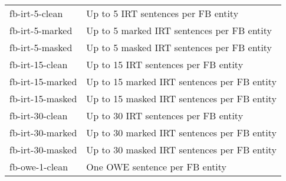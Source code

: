 \begin{tabular}{| l | l |}
    \hline

    fb-irt-5-clean    & Up to 5 IRT sentences per FB entity            \\
    fb-irt-5-marked   & Up to 5 marked IRT sentences per FB entity     \\
    fb-irt-5-masked   & Up to 5 masked IRT sentences per FB entity     \\

    \hline

    fb-irt-15-clean   & Up to 15 IRT sentences per FB entity           \\
    fb-irt-15-marked  & Up to 15 marked IRT sentences per FB entity    \\
    fb-irt-15-masked  & Up to 15 masked IRT sentences per FB entity    \\

    \hline

    fb-irt-30-clean   & Up to 30 IRT sentences per FB entity           \\
    fb-irt-30-marked  & Up to 30 marked IRT sentences per FB entity    \\
    fb-irt-30-masked  & Up to 30 masked IRT sentences per FB entity    \\

    \hline

    fb-owe-1-clean    & One OWE sentence per FB entity                 \\

    \hline
\end{tabular}
